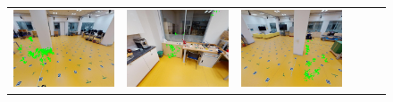 \documentclass[twoside]{ctuthesis}
\theoremstyle{plain}
\theoremstyle{definition}
\theoremstyle{note}
\begin{document}
{\begin{figure}
{\begin{tabular}{c|c|c|c|c|c}
    \includegraphics[width=\thiswidth]{evaluation/queryPipeline/38.jpg/chosen_cutout_2_-120_-30} & 
    \includegraphics[width=\thiswidth]{evaluation/queryPipeline/16.jpg/chosen_cutout_16_-180_-30} & 
    \includegraphics[width=\thiswidth]{evaluation/queryPipeline/26.jpg/chosen_cutout_10_-90_-30} \\[-1pt]

\end{tabular}}
\end{figure}}
\end{document}
